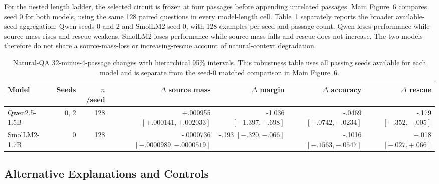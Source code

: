 \documentclass[letterpaper]{article} %
\begin{document}
For the nested length ladder, the selected circuit is frozen at four passages before appending unrelated
passages. Main Figure~6 compares seed 0 for both models, using the same 128 paired questions in every
model-length cell. Table~\ref{tab:supp-ladder} separately reports the broader available-seed aggregation:
Qwen seeds 0 and 2 and SmolLM2 seed 0, with 128 examples per seed and passage count. Qwen loses performance while
source mass rises and rescue weakens. SmolLM2 loses performance while source mass falls and rescue does not
increase. The two models therefore do not share a source-mass-loss or increasing-rescue account of
natural-context degradation.

\begin{table}[t]
\centering
\scriptsize
\setlength{\tabcolsep}{1.5pt}
\begin{tabular}{lrrrrrr}
\toprule
Model & Seeds & $n$/seed & $\Delta$ source mass & $\Delta$ margin & $\Delta$ accuracy & $\Delta$ rescue \\
\midrule
Qwen2.5-1.5B & 0, 2 & 128 & +.000955 $[+.000141,+.002033]$ & -1.036 $[-1.397,-.698]$ & -.0469 $[-.0742,-.0234]$ & -.179 $[-.352,-.005]$ \\
SmolLM2-1.7B & 0 & 128 & -.0000736 $[-.0000989,-.0000519]$ & -.193 $[-.320,-.066]$ & -.1016 $[-.1563,-.0547]$ & +.018 $[-.027,+.066]$ \\
\bottomrule
\end{tabular}
\caption{Natural-QA 32-minus-4-passage changes with hierarchical 95\% intervals. This robustness table uses
all passing seeds available for each model and is separate from the seed-0 matched comparison in Main Figure~6.}
\label{tab:supp-ladder}
\end{table}

\subsection{Alternative Explanations and Controls}
\end{document}
